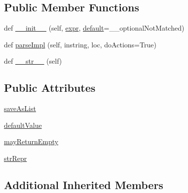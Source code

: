 \subsection*{Public Member Functions}
\begin{DoxyCompactItemize}
\item 
def \hyperlink{classpyparsing_1_1Optional_ae7cdc2f551349f35f0ad2697aa4856f1}{\+\_\+\+\_\+init\+\_\+\+\_\+} (self, \hyperlink{classpyparsing_1_1ParseElementEnhance_a0139048279aeac38804a10d131d3c340}{expr}, \hyperlink{namespacepyparsing_af718ddc22535044334309aa6db3c8bb9}{default}=\+\_\+\+\_\+optional\+Not\+Matched)
\item 
def \hyperlink{classpyparsing_1_1Optional_a409559688b076bb68b67491be0cd6cf9}{parse\+Impl} (self, instring, loc, do\+Actions=True)
\item 
def \hyperlink{classpyparsing_1_1Optional_a733b6e3fdc49b9586a4f98e41bb6c70d}{\+\_\+\+\_\+str\+\_\+\+\_\+} (self)
\end{DoxyCompactItemize}
\subsection*{Public Attributes}
\begin{DoxyCompactItemize}
\item 
\hyperlink{classpyparsing_1_1Optional_ae35eef3dc33dcd0ce0ed5740124e2f59}{save\+As\+List}
\item 
\hyperlink{classpyparsing_1_1Optional_a7288ea089b6fc92df8ff14794237a518}{default\+Value}
\item 
\hyperlink{classpyparsing_1_1Optional_a8962112c51a291f8d2dc5f6e783a7e1c}{may\+Return\+Empty}
\item 
\hyperlink{classpyparsing_1_1Optional_af1702e1c5920c5d752b36057a682ef44}{str\+Repr}
\end{DoxyCompactItemize}
\subsection*{Additional Inherited Members}


